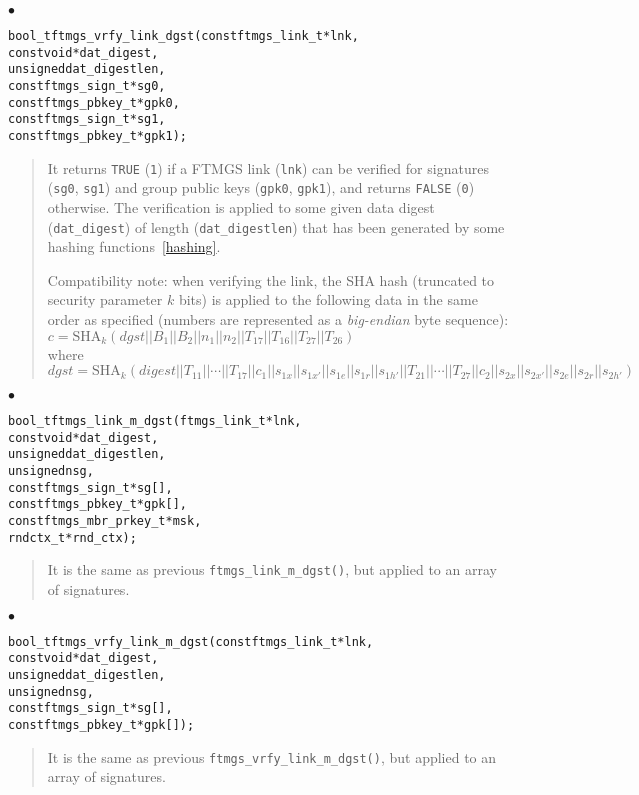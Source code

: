 \documentclass[a4paper]{article}
\newenvironment{api}%
{\noindent$\bullet$\hfill\begin{minipage}[t]{0.97\linewidth}\footnotesize\begin{alltt}}%
{\end{alltt}\end{minipage}}%
\begin{document}
\begin{api}
bool_t ftmgs_vrfy_link_dgst(const ftmgs_link_t* lnk,
                            const void* dat_digest,
                            unsigned dat_digestlen,
                            const ftmgs_sign_t* sg0,
                            const ftmgs_pbkey_t* gpk0,
                            const ftmgs_sign_t* sg1,
                            const ftmgs_pbkey_t* gpk1);
\end{api}
\begin{quote}\footnotesize
It returns \verb|TRUE| (\verb|1|) if a FTMGS link (\verb|lnk|) can be
verified for signatures (\verb|sg0|, \verb|sg1|) and group public keys
(\verb|gpk0|, \verb|gpk1|), and returns \verb|FALSE| (\verb|0|)
otherwise. The verification is applied to some given data digest
(\verb|dat_digest|) of length (\verb|dat_digestlen|) that has been
generated by some hashing functions~\ref{hashing}.

Compatibility note: when verifying the link, the SHA hash
(truncated to security parameter $k$ bits) is applied to the following
data in the same order as specified (numbers are represented as a
\emph{big-endian} byte sequence):\\ {$c =
  \mathrm{SHA}_k(\mathit{dgst}||B_1||B_2||n_1||n_2||T_{17}||T_{16}||T_{27}||T_{26})$}
\\ where 
$\mathit{dgst} = \mathrm{SHA}_k(\mathit{digest}||T_{11}||\cdots||T_{17}||c_1||s_{1x}||s_{1x'}||s_{1e}||s_{1r}||s_{1h'}||T_{21}||\cdots||T_{27}||c_2||s_{2x}||s_{2x'}||s_{2e}||s_{2r}||s_{2h'})$
\end{quote}
\begin{api}
bool_t ftmgs_link_m_dgst(ftmgs_link_t* lnk,
                         const void* dat_digest,
                         unsigned dat_digestlen,
                         unsigned nsg,
                         const ftmgs_sign_t* sg[],
                         const ftmgs_pbkey_t* gpk[],
                         const ftmgs_mbr_prkey_t* msk,
                         rndctx_t* rnd_ctx);
\end{api}
\begin{quote}\footnotesize
It is the same as previous \verb|ftmgs_link_m_dgst()|, but applied to an
array of signatures.
\end{quote}
\begin{api}
bool_t ftmgs_vrfy_link_m_dgst(const ftmgs_link_t* lnk,
                              const void* dat_digest,
                              unsigned dat_digestlen,
                              unsigned nsg,
                              const ftmgs_sign_t* sg[],
                              const ftmgs_pbkey_t* gpk[]);
\end{api}
\begin{quote}\footnotesize
It is the same as previous \verb|ftmgs_vrfy_link_m_dgst()|, but applied to an
array of signatures.
\end{quote}
\end{document}
